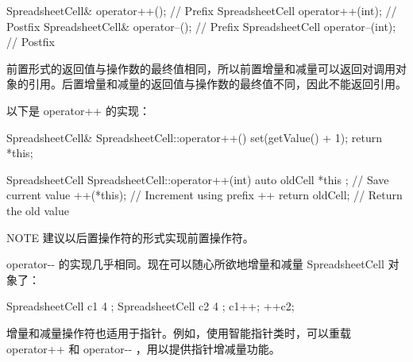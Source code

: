\begin{cpp}
SpreadsheetCell& operator++(); // Prefix
SpreadsheetCell operator++(int); // Postfix
SpreadsheetCell& operator--(); // Prefix
SpreadsheetCell operator--(int); // Postfix
\end{cpp}

前置形式的返回值与操作数的最终值相同，所以前置增量和减量可以返回对调用对象的引用。后置增量和减量的返回值与操作数的最终值不同，因此不能返回引用。

以下是 operator++ 的实现：

\begin{cpp}
SpreadsheetCell& SpreadsheetCell::operator++()
{
    set(getValue() + 1);
    return *this;
}

SpreadsheetCell SpreadsheetCell::operator++(int)
{
    auto oldCell { *this }; // Save current value
    ++(*this); // Increment using prefix ++
    return oldCell; // Return the old value
}
\end{cpp}

\begin{myNotic}{NOTE}
建议以后置操作符的形式实现前置操作符。
\end{myNotic}

operator-{}- 的实现几乎相同。现在可以随心所欲地增量和减量 SpreadsheetCell 对象了：

\begin{cpp}
SpreadsheetCell c1 { 4 };
SpreadsheetCell c2 { 4 };
c1++;
++c2;
\end{cpp}

增量和减量操作符也适用于指针。例如，使用智能指针类时，可以重载 operator++ 和 operator-{}- ，用以提供指针增减量功能。



